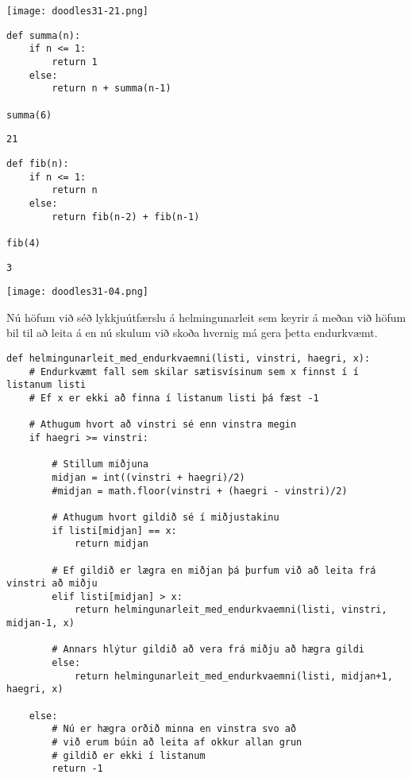 \phantom{easter egg}
	\begin{center}
		\texttt{[image: doodles31-21.png]}
	\end{center}


\begin{lstlisting}[caption=Summa reiknuð endurkvæmt, label=lst:reiknirit-endurkvæmni-summa]
def summa(n):
	if n <= 1:
		return 1
	else:
		return n + summa(n-1)

summa(6)
\end{lstlisting}
\lstset{style=uttak}
\begin{lstlisting}
21
\end{lstlisting}
\lstset{style=venjulegt}

\begin{lstlisting}[caption=Fibonacci tölur reiknaðar endurkvæmt, label=lst:reiknirit-endurkvæmni-fib]
def fib(n):
	if n <= 1:
		return n
	else:
		return fib(n-2) + fib(n-1)

fib(4)
\end{lstlisting}
\lstset{style=uttak}
\begin{lstlisting}
3
\end{lstlisting}
\lstset{style=venjulegt}

	\begin{center}
		\texttt{[image: doodles31-04.png]}
	\end{center}

Nú höfum við séð lykkjuútfærslu á helmingunarleit sem keyrir á meðan við höfum bil til að leita á en nú skulum við skoða hvernig má gera þetta endurkvæmt.

\begin{lstlisting}[caption=Helmingunarleit að tölu í röðuðum lista með endurkvæmni, label=lst:reiknirit-helm-end]
def helmingunarleit_med_endurkvaemni(listi, vinstri, haegri, x): 
	# Endurkvæmt fall sem skilar sætisvísinum sem x finnst í í listanum listi
	# Ef x er ekki að finna í listanum listi þá fæst -1
	
	# Athugum hvort að vinstri sé enn vinstra megin
	if haegri >= vinstri: 
	
		# Stillum miðjuna
		midjan = int((vinstri + haegri)/2)
		#midjan = math.floor(vinstri + (haegri - vinstri)/2)
		
		# Athugum hvort gildið sé í miðjustakinu
		if listi[midjan] == x: 
			return midjan 
		
		# Ef gildið er lægra en miðjan þá þurfum við að leita frá vinstri að miðju
		elif listi[midjan] > x: 
			return helmingunarleit_med_endurkvaemni(listi, vinstri, midjan-1, x) 
	
		# Annars hlýtur gildið að vera frá miðju að hægra gildi
		else: 
			return helmingunarleit_med_endurkvaemni(listi, midjan+1, haegri, x) 
	
	else: 
		# Nú er hægra orðið minna en vinstra svo að
		# við erum búin að leita af okkur allan grun
		# gildið er ekki í listanum
		return -1
\end{lstlisting}

